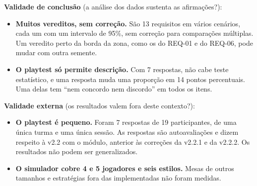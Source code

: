 \textbf{Validade de conclusão} (a análise dos dados sustenta as afirmações?):
\begin{itemize}
  \item \textbf{Muitos vereditos, sem correção.} São 13 requisitos em vários cenários, cada um com um
    intervalo de 95\%, sem correção para comparações múltiplas. Um veredito perto da borda da zona, como os do
    REQ-01 e do REQ-06, pode mudar com outra semente.
  \item \textbf{O playtest só permite descrição.} Com 7 respostas, não cabe teste estatístico, e uma
    resposta muda uma proporção em 14 pontos percentuais. Uma delas tem ``nem concordo nem discordo'' em todos
    os itens.
\end{itemize}

\textbf{Validade externa} (os resultados valem fora deste contexto?):
\begin{itemize}
  \item \textbf{O playtest é pequeno.} Foram 7 respostas de 19 participantes, de uma única turma e uma única
    sessão. As respostas são autoavaliações e dizem respeito à v2.2 com o módulo, anterior às correções da
    v2.2.1 e da v2.2.2. Os resultados não podem ser generalizados.
  \item \textbf{O simulador cobre 4 e 5 jogadores e seis estilos.} Mesas de outros tamanhos e
    estratégias fora das implementadas não foram medidas.
\end{itemize}

